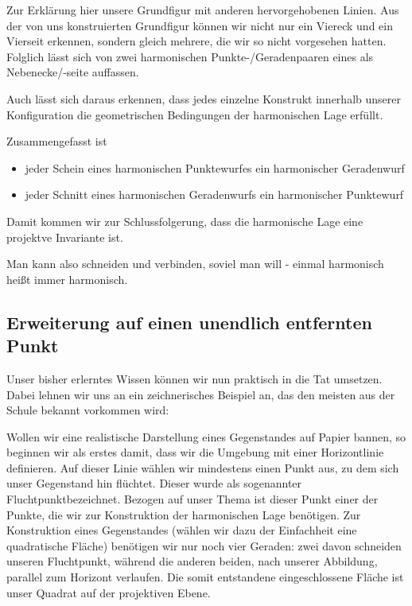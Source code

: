 \documentclass[12pt,a4paper]{article}
\begin{document}
Zur Erklärung hier unsere Grundfigur mit anderen hervorgehobenen Linien. Aus der von uns konstruierten Grundfigur können wir nicht nur ein Viereck und ein Vierseit erkennen, sondern gleich mehrere, die wir so nicht vorgesehen hatten. Folglich lässt sich von zwei harmonischen Punkte-/Geradenpaaren eines als Nebenecke/-seite auffassen.

Auch lässt sich daraus erkennen, dass jedes einzelne Konstrukt innerhalb unserer Konfiguration die geometrischen Bedingungen der harmonischen Lage erfüllt.

Zusammengefasst ist

\begin{itemize}
\item[] jeder Schein eines harmonischen Punktewurfes ein harmonischer Geradenwurf
\item[] jeder Schnitt eines harmonischen Geradenwurfs ein harmonischer Punktewurf
\end{itemize}

Damit kommen wir zur Schlussfolgerung, dass die harmonische Lage eine projektve Invariante ist.

\glqq Man kann also schneiden und verbinden, soviel man will - einmal harmonisch heißt immer harmonisch.~\citep[s.~][S.~49]{projektiveGeometrie}\grqq

\newpage
\subsection{Erweiterung auf einen unendlich entfernten Punkt}

Unser bisher erlerntes Wissen können wir nun praktisch in die Tat umsetzen. Dabei lehnen wir uns an ein zeichnerisches Beispiel an, das den meisten aus der Schule bekannt vorkommen wird:

Wollen wir eine realistische Darstellung eines Gegenstandes auf Papier bannen, so beginnen wir als erstes damit, dass wir die Umgebung mit einer Horizontlinie definieren. Auf dieser Linie wählen wir mindestens einen Punkt aus, zu dem sich unser Gegenstand hin \glqq flüchtet\grqq . Dieser wurde als sogenannter \glqq Fluchtpunkt\grqq bezeichnet. Bezogen auf unser Thema ist dieser Punkt einer der Punkte, die wir zur Konstruktion der harmonischen Lage benötigen. Zur Konstruktion eines Gegenstandes (wählen wir dazu der Einfachheit eine quadratische Fläche) benötigen wir nur noch vier Geraden: zwei davon schneiden unseren Fluchtpunkt, während die anderen beiden, nach unserer Abbildung, parallel zum Horizont verlaufen. Die somit entstandene eingeschlossene Fläche ist unser Quadrat auf der projektiven Ebene.
\end{document}
